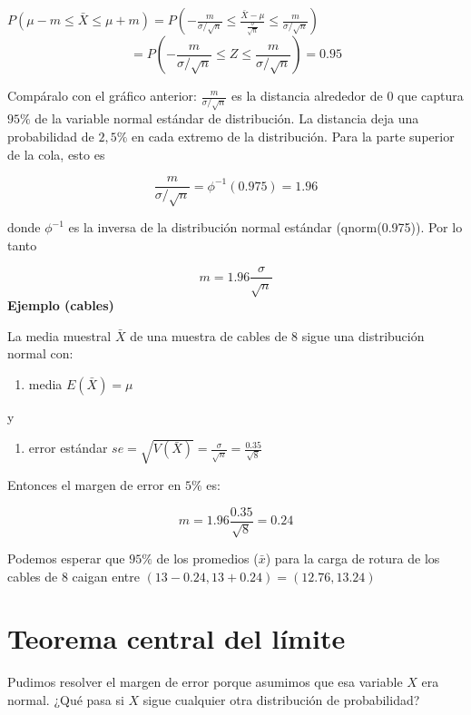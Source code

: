 \documentclass[
]{book}
\providecommand{\tightlist}{%
  \setlength{\itemsep}{0pt}\setlength{\parskip}{0pt}}
\begin{document}
\(P(\mu-m \leq \bar{X} \leq\mu + m)=P(-\frac{m}{\sigma/\sqrt{n}} \leq \frac{\bar{X} -\mu}{\frac{\sigma}{\sqrt{n}}}\leq\frac{m}{\sigma/\sqrt{n}})\)
\[=P(-\frac{m}{\sigma/\sqrt{n}} \leq Z \leq\frac{m}{\sigma/\sqrt{n}})=0.95\]

Compáralo con el gráfico anterior: \(\frac{m}{\sigma/\sqrt{n}}\) es la distancia alrededor de \(0\) que captura \(95\%\) de la variable normal estándar de distribución. La distancia deja una probabilidad de \(2,5\%\) en cada extremo de la distribución. Para la parte superior de la cola, esto es

\[\frac{m}{\sigma/\sqrt{n}}=\phi^{-1}(0.975)=1.96\]

donde \(\phi^{-1}\) es la inversa de la distribución normal estándar (qnorm(0.975)). Por lo tanto

\[m=1.96 \frac{\sigma}{\sqrt{n}}\]
\textbf{Ejemplo (cables)}

La media muestral \(\bar{X}\) de una muestra de cables de \(8\) sigue una distribución normal con:

\begin{enumerate}
\def\labelenumi{\arabic{enumi}.}
\tightlist
\item
  media \(E(\bar{X})=\mu\)
\end{enumerate}

y

\begin{enumerate}
\def\labelenumi{\arabic{enumi}.}
\setcounter{enumi}{1}
\tightlist
\item
  error estándar \(se=\sqrt{V(\bar{X})}=\frac{\sigma}{\sqrt{n}}=\frac{0.35}{\sqrt{8}}\)
\end{enumerate}

Entonces el margen de error en \(5\%\) es:

\[m=1.96\frac{0.35}{\sqrt{8}}=0.24\]

Podemos esperar que \(95\%\) de los promedios (\(\bar{x}\)) para la carga de rotura de los cables de \(8\) caigan entre \((13-0.24, 13+0.24)=(12.76, 13.24)\)

\hypertarget{teorema-central-del-luxedmite-1}{%
\section{Teorema central del límite}\label{teorema-central-del-luxedmite-1}}

Pudimos resolver el margen de error porque asumimos que esa variable \(X\) era normal. ¿Qué pasa si \(X\) sigue cualquier otra distribución de probabilidad?
\end{document}
